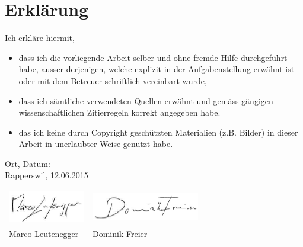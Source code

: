 
\chapter*{Erklärung}

Ich erkläre hiermit,
\begin{itemize}
	\item dass ich die vorliegende Arbeit selber und ohne fremde Hilfe durchgeführt habe, ausser derjenigen, welche explizit in der Aufgabenstellung erwähnt ist oder mit dem Betreuer schriftlich vereinbart wurde,
	\item dass ich sämtliche verwendeten Quellen erwähnt und gemäss gängigen wissenschaftlichen Zitierregeln korrekt angegeben habe.
	\item das ich keine durch Copyright geschützten Materialien (z.B. Bilder) in dieser Arbeit in unerlaubter Weise genutzt habe.
\end{itemize}

Ort, Datum: \\
Rapperswil, 12.06.2015

\begin{tabularx}{\textwidth}{XX}
\includegraphics[scale=1]{start/img/marcoLeutenegger} & \includegraphics[scale=1]{start/img/dominikFreier} \\
Marco Leutenegger & \hspace{1cm} Dominik Freier
\end{tabularx}